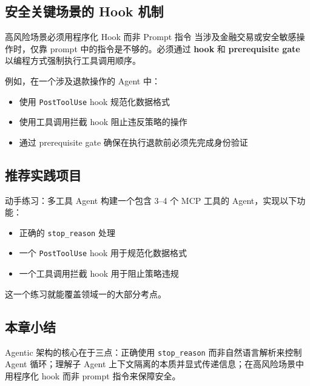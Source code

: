 \subsection{安全关键场景的 Hook 机制}

\begin{importantbox}{高风险场景必须用程序化 Hook 而非 Prompt 指令}
当涉及金融交易或安全敏感操作时，仅靠 prompt 中的指令是不够的。必须通过 \textbf{hook} 和 \textbf{prerequisite gate} 以编程方式强制执行工具调用顺序。
\end{importantbox}

例如，在一个涉及退款操作的 Agent 中：
\begin{itemize}[leftmargin=1.5em]
    \item 使用 \texttt{PostToolUse} hook 规范化数据格式
    \item 使用工具调用拦截 hook 阻止违反策略的操作
    \item 通过 prerequisite gate 确保在执行退款前必须先完成身份验证
\end{itemize}

\subsection{推荐实践项目}

\begin{knowledgebox}{动手练习：多工具 Agent}
构建一个包含 3--4 个 MCP 工具的 Agent，实现以下功能：
\begin{itemize}[leftmargin=1.5em]
    \item 正确的 \texttt{stop\_reason} 处理
    \item 一个 \texttt{PostToolUse} hook 用于规范化数据格式
    \item 一个工具调用拦截 hook 用于阻止策略违规
\end{itemize}
这一个练习就能覆盖领域一的大部分考点。
\end{knowledgebox}

\subsection{本章小结}

Agentic 架构的核心在于三点：正确使用 \texttt{stop\_reason} 而非自然语言解析来控制 Agent 循环；理解子 Agent 上下文隔离的本质并显式传递信息；在高风险场景中用程序化 hook 而非 prompt 指令来保障安全。

